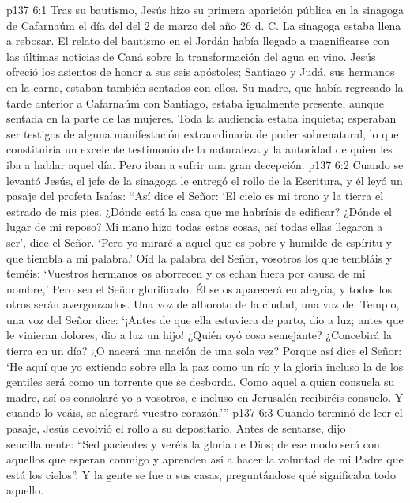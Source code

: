 \vs p137 6:1 Tras su bautismo, Jesús hizo su primera aparición pública en la sinagoga de Cafarnaúm el día del  del 2 de marzo del año 26 d. C. La sinagoga estaba llena a rebosar. El relato del bautismo en el Jordán había llegado a magnificarse con las últimas noticias de Caná sobre la transformación del agua en vino. Jesús ofreció los asientos de honor a sus seis apóstoles; Santiago y Judá, sus hermanos en la carne, estaban también sentados con ellos. Su madre, que había regresado la tarde anterior a Cafarnaúm con Santiago, estaba igualmente presente, aunque sentada en la parte de las mujeres. Toda la audiencia estaba inquieta; esperaban ser testigos de alguna manifestación extraordinaria de poder sobrenatural, lo que constituiría un excelente testimonio de la naturaleza y la autoridad de quien les iba a hablar aquel día. Pero iban a sufrir una gran decepción.
\vs p137 6:2 Cuando se levantó Jesús, el jefe de la sinagoga le entregó el rollo de la Escritura, y él leyó un pasaje del profeta Isaías: “Así dice el Señor: ‘El cielo es mi trono y la tierra el estrado de mis pies. ¿Dónde está la casa que me habríais de edificar? ¿Dónde el lugar de mi reposo? Mi mano hizo todas estas cosas, así todas ellas llegaron a ser’, dice el Señor. ‘Pero yo miraré a aquel que es pobre y humilde de espíritu y que tiembla a mi palabra.’ Oíd la palabra del Señor, vosotros los que tembláis y teméis: ‘Vuestros hermanos os aborrecen y os echan fuera por causa de mi nombre,’ Pero sea el Señor glorificado. Él se os aparecerá en alegría, y todos los otros serán avergonzados. Una voz de alboroto de la ciudad, una voz del Templo, una voz del Señor dice: ‘¡Antes de que ella estuviera de parto, dio a luz; antes que le vinieran dolores, dio a luz un hijo! ¿Quién oyó cosa semejante? ¿Concebirá la tierra en un día? ¿O nacerá una nación de una sola vez? Porque así dice el Señor: ‘He aquí que yo extiendo sobre ella la paz como un río y la gloria incluso la de los gentiles será como un torrente que se desborda. Como aquel a quien consuela su madre, así os consolaré yo a vosotros, e incluso en Jerusalén recibiréis consuelo. Y cuando lo veáis, se alegrará vuestro corazón.’”
\vs p137 6:3 Cuando terminó de leer el pasaje, Jesús devolvió el rollo a su depositario. Antes de sentarse, dijo sencillamente: “Sed pacientes y veréis la gloria de Dios; de ese modo será con aquellos que esperan conmigo y aprenden así a hacer la voluntad de mi Padre que está los cielos”. Y la gente se fue a sus casas, preguntándose qué significaba todo aquello.
